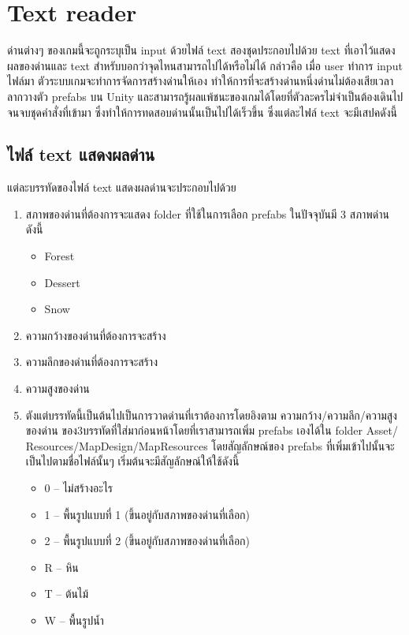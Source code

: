 \section{Text reader}
ด่านต่างๆ ของเกมนี้จะถูกระบุเป็น input ด้วยไฟล์ text สองชุดประกอบไปด้วย text ที่เอาไว้แสดงผลของด่านและ text สำหรับบอกว่าจุดไหนสามารถไปได้หรือไม่ได้ กล่าวคือ เมื่อ user ทำการ input ไฟล์มา ตัวระบบเกมจะทำการจัดการสร้างด่านให้เอง
ทำให้การที่จะสร้างด่านหนึ่งด่านไม่ต้องเสียเวลาลากวางตัว prefabs บน Unity และสามารถรู้ผลแพ้ชนะของเกมได้โดยที่ตัวละครไม่จำเป็นต้องเดินไปจนจบชุดคำสั่งที่เข้ามา ซึ่งทำให้การทดสอบด่านนั้นเป็นไปได้เร็วขึ้น
ซึ่งแต่ละไฟล์ text จะมีเสปคดังนี้
\subsection{ไฟล์ text แสดงผลด่าน}
แต่ละบรรทัดของไฟล์ text แสดงผลด่านจะประกอบไปด้วย
\begin{enumerate}
    \item สภาพของด่านที่ต้องการจะแสดง folder ที่ใช้ในการเลือก prefabs ในปัจจุบันมี 3 สภาพด่าน ดังนี้
    \begin{itemize}
        \item Forest
        \item Dessert
        \item Snow
    \end{itemize}
    \item ความกว้างของด่านที่ต้องการจะสร้าง
    \item ความลึกของด่านที่ต้องการจะสร้าง
    \item ความสูงของด่าน
    \item ตังแต่บรรทัดนี้เป็นต้นไปเป็นการวาดด่านที่เราต้องการโดยอิงตาม ความกว้าง/ความลึก/ความสูงของด่าน ของ3บรรทัดที่ใส่มาก่อนหน้าโดยที่เราสามารถเพิ่ม prefabs เองได้ใน folder Asset/ \newline
    Resources/MapDesign/MapResources โดยสัญลักษณ์ของ prefabs ที่เพิ่มเข้าไปนั้นจะเป็นไปตามชื่อไฟล์นั้นๆ เริ่มต้นจะมีสัญลักษณ์ให้ใช้ดังนี้
    \begin{itemize}
        \item 0 -- ไม่สร้างอะไร
        \item 1 -- พื้นรูปแบบที่ 1 (ขึ้นอยู่กับสภาพของด่านที่เลือก)
        \item 2 -- พื้นรูปแบบที่ 2 (ขึ้นอยู่กับสภาพของด่านที่เลือก)
        \item R -- หิน
        \item T -- ต้นไม้
        \item W -- พื้นรูปน้ำ
    \end{itemize}
\end{enumerate}
